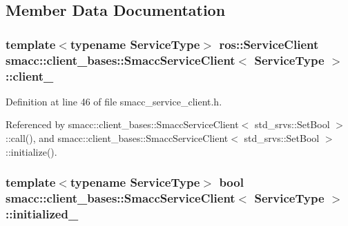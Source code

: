 \subsection{Member Data Documentation}
\subsubsection[{\texorpdfstring{client\+\_\+}{client_}}]{\setlength{\rightskip}{0pt plus 5cm}template$<$typename Service\+Type$>$ ros\+::\+Service\+Client {\bf smacc\+::client\+\_\+bases\+::\+Smacc\+Service\+Client}$<$ Service\+Type $>$\+::client\+\_\+\hspace{0.3cm}{\ttfamily [protected]}}\hypertarget{classsmacc_1_1client__bases_1_1SmaccServiceClient_a632093eb6bc8b058dec492b21c8536f9}{}\label{classsmacc_1_1client__bases_1_1SmaccServiceClient_a632093eb6bc8b058dec492b21c8536f9}


Definition at line 46 of file smacc\+\_\+service\+\_\+client.\+h.



Referenced by smacc\+::client\+\_\+bases\+::\+Smacc\+Service\+Client$<$ std\+\_\+srvs\+::\+Set\+Bool $>$\+::call(), and smacc\+::client\+\_\+bases\+::\+Smacc\+Service\+Client$<$ std\+\_\+srvs\+::\+Set\+Bool $>$\+::initialize().

\subsubsection[{\texorpdfstring{initialized\+\_\+}{initialized_}}]{\setlength{\rightskip}{0pt plus 5cm}template$<$typename Service\+Type$>$ {\bf bool} {\bf smacc\+::client\+\_\+bases\+::\+Smacc\+Service\+Client}$<$ Service\+Type $>$\+::initialized\+\_\+\hspace{0.3cm}{\ttfamily [protected]}}\hypertarget{classsmacc_1_1client__bases_1_1SmaccServiceClient_ad36816c62fc14380a6d0782a2592a5b4}{}\label{classsmacc_1_1client__bases_1_1SmaccServiceClient_ad36816c62fc14380a6d0782a2592a5b4}


